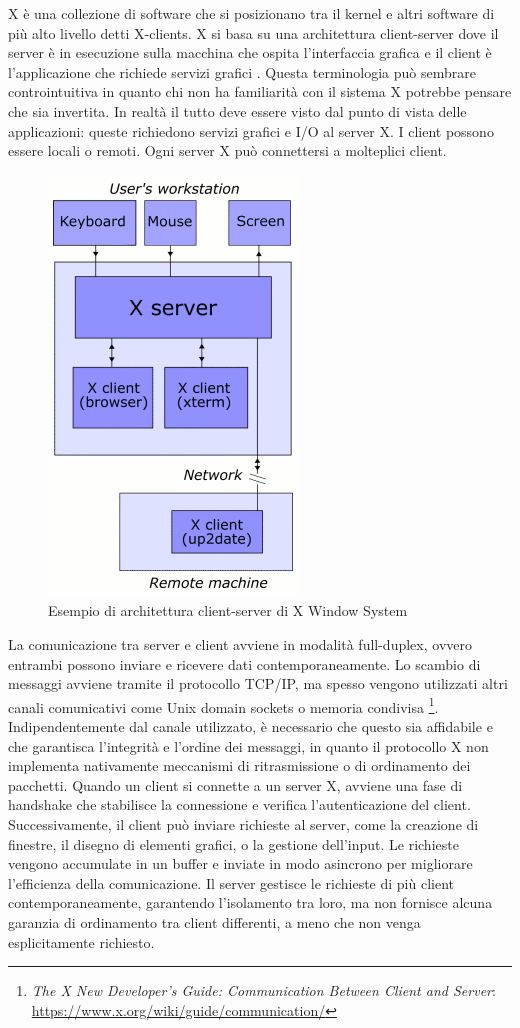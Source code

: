 \documentclass[12pt,a4paper,openright,twoside]{book}
\begin{document}
X è una collezione di software che si posizionano tra il kernel e altri software di più alto livello detti X-clients.
X si basa su una architettura client-server dove il server è in esecuzione sulla macchina che ospita l'interfaccia grafica e il client è l'applicazione che richiede servizi grafici \cite{Scheifler1986}.
%
Questa terminologia può sembrare controintuitiva in quanto chi non ha familiarità con il sistema X potrebbe pensare che sia invertita.
In realtà il tutto deve essere visto dal punto di vista delle applicazioni: queste richiedono servizi grafici e I/O al server X.
I client possono essere locali o remoti. Ogni server X può connettersi a molteplici client.
\begin{figure}
    \centering
    \includegraphics[width=.3\linewidth]{figures/X_client_server_example.png}
    \caption[xarch]{Esempio di architettura client-server di X Window System \footnotemark}
\end{figure}

La comunicazione tra server e client avviene in modalità full-duplex,
ovvero entrambi possono inviare e ricevere dati contemporaneamente.
%
Lo scambio di messaggi avviene tramite il protocollo TCP/IP,
ma spesso vengono utilizzati altri canali comunicativi come Unix domain sockets o memoria condivisa \footnote{\emph{The X New Developer’s Guide: Communication Between Client and Server}: \url{https://www.x.org/wiki/guide/communication/}}.
%
Indipendentemente dal canale utilizzato, è necessario che questo sia affidabile e che garantisca l'integrità e l'ordine dei messaggi,
in quanto il protocollo X non implementa nativamente meccanismi di ritrasmissione o di ordinamento dei pacchetti.
%
Quando un client si connette a un server X, avviene una fase di handshake che stabilisce la connessione e verifica l'autenticazione del client. Successivamente, il client può inviare richieste al server, come la creazione di finestre, il disegno di elementi grafici, o la gestione dell'input. Le richieste vengono accumulate in un buffer e inviate in modo asincrono per migliorare l'efficienza della comunicazione. Il server gestisce le richieste di più client contemporaneamente, garantendo l'isolamento tra loro, ma non fornisce alcuna garanzia di ordinamento tra client differenti, a meno che non venga esplicitamente richiesto.
\end{document}

